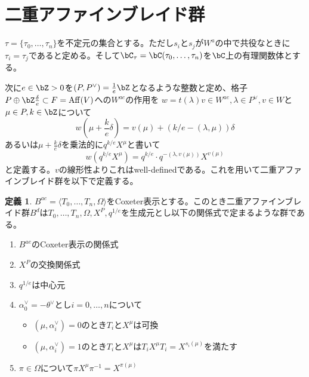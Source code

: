 \documentclass[uplatex, a4paper, dvipdfmx]{jsarticle}
\theoremstyle{definition}
\newtheorem{definition}[theorem]{定義}
\DeclareMathOperator{\Aff}{\mathrm{Aff}}
\begin{document}
\section{二重アファインブレイド群}
$\tau =\{\tau_0, \dots, \tau_n\}$を不定元の集合とする。ただし$s_i$と$s_j$が$W^a$の中で共役なときに$\tau_i = \tau_j$であると定める。そして$\bC_\tau = \bC(\tau_0, \dots, \tau_n)$を$\bC$上の有理関数体とする。

次に$e \in \bZ>0$を$(P, P^\vee) = \frac{1}{e}\bZ$となるような整数と定め、格子$P \oplus \bZ \frac{\delta}{e} \subset F = \Aff(V)$への$W^{ae}$の作用を
$w = t(\lambda)v \in W^{ae}, \lambda \in P^\vee, v \in W$と$\mu \in P, k \in \bZ$について
\begin{equation}
    w\left(\mu + \frac{k}{e} \delta\right) = v(\mu) +\left(k/e - (\lambda, \mu)\right)\delta
\end{equation}
あるいは$\mu + \frac{k}{e} \delta$を乗法的に$q^{k/e} X^\mu$と書いて
\begin{equation}
    w(q^{k/e}X^\mu) = q^{k/e} \cdot q^{-(\lambda, v(\mu))}X^{v(\mu)}
\end{equation}
と定義する。$v$の線形性よりこれはwell-definedである。これを用いて二重アファインブレイド群を以下で定義する。
\begin{definition}
    $B^{ae} = \langle T_0, \dots, T_n, \Omega\rangle$をCoxeter表示とする。このとき二重アファインブレイド群$B^d$は$T_0, \dots, T_n, \Omega, X^P, q^{1/e}$を生成元とし以下の関係式で定まるような群である。
    \begin{enumerate}
        \item $B^{ae}$のCoxeter表示の関係式
        \item $X^P$の交換関係式
        \item $q^{1/e}$は中心元
        \item $\alpha_0^\vee = -\theta^\vee$とし$i = 0, \dots, n$について
              \begin{itemize}
                  \item $(\mu, \alpha_i^\vee) = 0$のとき$T_i$と$X^\mu$は可換
                  \item $(\mu, \alpha_i^\vee) = 1$のとき$T_i$と$X^\mu$は$T_iX^\mu T_i = X^{s_i(\mu)}$を満たす
              \end{itemize}
        \item $\pi \in \Omega$について$\pi X^\mu \pi^{-1} = X^{\pi(\mu)}$
    \end{enumerate}
\end{definition}
\end{document}
